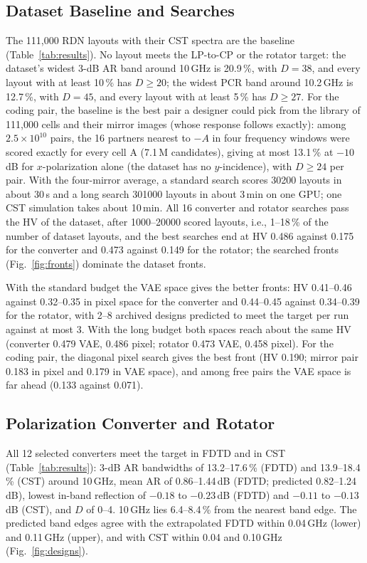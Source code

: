 \documentclass[journal]{IEEEtran}
\begin{document}
\subsection{Dataset Baseline and Searches}
The 111,000 RDN layouts with their CST spectra are the baseline (Table~\ref{tab:results}). No layout meets the LP-to-CP or the rotator target: the dataset's widest 3-dB AR band around 10\,GHz is 20.9\,\%, with $D=38$, and every layout with at least 10\,\% has $D\geq20$; the widest PCR band around 10.2\,GHz is 12.7\,\%, with $D=45$, and every layout with at least 5\,\% has $D\geq27$. For the coding pair, the baseline is the best pair a designer could pick from the library of 111,000 cells and their mirror images (whose response follows exactly): among $2.5\times10^{10}$ pairs, the 16 partners nearest to $-A$ in four frequency windows were scored exactly for every cell A (7.1\,M candidates), giving at most 13.1\,\% at $-10$\,dB for $x$-polarization alone (the dataset has no $y$-incidence), with $D\geq24$ per pair. With the four-mirror average, a standard search scores \num{30200} layouts in about 30\,s and a long search \num{301000} layouts in about 3\,min on one GPU; one CST simulation takes about 10\,min. All 16 converter and rotator searches pass the HV of the dataset, after \num{1000}--\num{20000} scored layouts, i.e., 1--18\,\% of the number of dataset layouts, and the best searches end at HV 0.486 against 0.175 for the converter and 0.473 against 0.149 for the rotator; the searched fronts (Fig.~\ref{fig:fronts}) dominate the dataset fronts.

With the standard budget the VAE space gives the better fronts: HV 0.41--0.46 against 0.32--0.35 in pixel space for the converter and 0.44--0.45 against 0.34--0.39 for the rotator, with 2--8 archived designs predicted to meet the target per run against at most 3. With the long budget both spaces reach about the same HV (converter 0.479 VAE, 0.486 pixel; rotator 0.473 VAE, 0.458 pixel). For the coding pair, the diagonal pixel search gives the best front (HV 0.190; mirror pair 0.183 in pixel and 0.179 in VAE space), and among free pairs the VAE space is far ahead (0.133 against 0.071).

\subsection{Polarization Converter and Rotator}
All 12 selected converters meet the target in FDTD and in CST (Table~\ref{tab:results}): 3-dB AR bandwidths of 13.2--17.6\,\% (FDTD) and 13.9--18.4\,\% (CST) around 10\,GHz, mean AR of 0.86--1.44\,dB (FDTD; predicted 0.82--1.24\,dB), lowest in-band reflection of $-0.18$ to $-0.23$\,dB (FDTD) and $-0.11$ to $-0.13$\,dB (CST), and $D$ of 0--4. 10\,GHz lies 6.4--8.4\,\% from the nearest band edge. The predicted band edges agree with the extrapolated FDTD within 0.04\,GHz (lower) and 0.11\,GHz (upper), and with CST within 0.04 and 0.10\,GHz (Fig.~\ref{fig:designs}).
\end{document}
